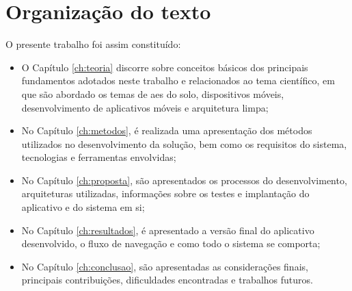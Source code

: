 \section{Organização do texto}

O presente trabalho foi assim constituído:
\begin{itemize}
    \item O Capítulo \ref{ch:teoria} discorre sobre conceitos básicos dos principais fundamentos adotados neste trabalho e relacionados ao tema científico, em que são abordado os temas de \acp{ae} do solo, dispositivos móveis, desenvolvimento de aplicativos móveis e arquitetura limpa;
    \item No Capítulo \ref{ch:metodos}, é realizada uma apresentação dos métodos utilizados no desenvolvimento da solução, bem como os requisitos do sistema, tecnologias e ferramentas envolvidas;
    \item No Capítulo \ref{ch:proposta}, são apresentados os processos do desenvolvimento, arquiteturas utilizadas, informações sobre os testes e implantação do aplicativo e do sistema em si;
    \item No Capítulo \ref{ch:resultados}, é apresentado a versão final do aplicativo desenvolvido, o fluxo de navegação e como todo o sistema se comporta;
    \item No Capítulo \ref{ch:conclusao}, são apresentadas as considerações finais, principais contribuições, dificuldades encontradas e trabalhos futuros.
\end{itemize}
